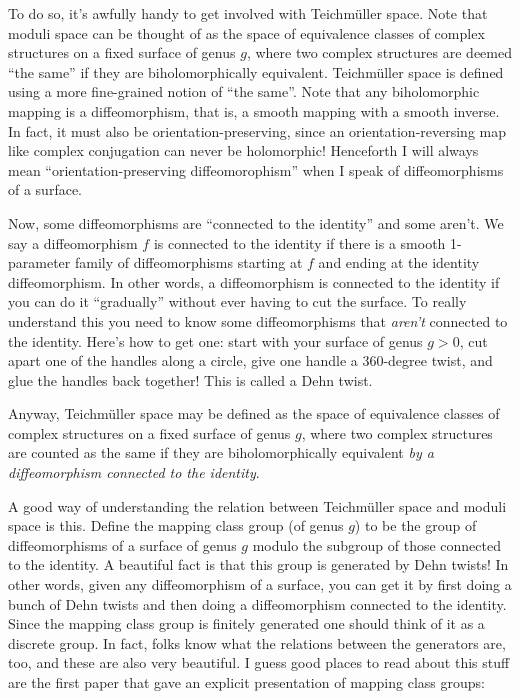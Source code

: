 \documentclass[12pt]{article}
\begin{document}
To do so, it's awfully handy to get involved with Teichm\"uller space.
Note that moduli space can be thought of as the space of equivalence
classes of complex structures on a fixed surface of genus \(g\), where
two complex structures are deemed ``the same'' if they are
biholomorphically equivalent. Teichm\"uller space is defined using a more
fine-grained notion of ``the same''. Note that any biholomorphic mapping
is a diffeomorphism, that is, a smooth mapping with a smooth inverse. In
fact, it must also be orientation-preserving, since an
orientation-reversing map like complex conjugation can never be
holomorphic! Henceforth I will always mean ``orientation-preserving
diffeomorophism'' when I speak of diffeomorphisms of a surface.

Now, some diffeomorphisms are ``connected to the identity'' and some
aren't. We say a diffeomorphism \(f\) is connected to the identity if
there is a smooth 1-parameter family of diffeomorphisms starting at
\(f\) and ending at the identity diffeomorphism. In other words, a
diffeomorphism is connected to the identity if you can do it
``gradually'' without ever having to cut the surface. To really
understand this you need to know some diffeomorphisms that \emph{aren't}
connected to the identity. Here's how to get one: start with your
surface of genus \(g > 0\), cut apart one of the handles along a circle,
give one handle a 360-degree twist, and glue the handles back together!
This is called a Dehn twist.

Anyway, Teichm\"uller space may be defined as the space of equivalence
classes of complex structures on a fixed surface of genus \(g\), where
two complex structures are counted as the same if they are
biholomorphically equivalent \emph{by a diffeomorphism connected to the
identity}.

A good way of understanding the relation between Teichm\"uller space and
moduli space is this. Define the mapping class group (of genus \(g\)) to
be the group of diffeomorphisms of a surface of genus \(g\) modulo the
subgroup of those connected to the identity. A beautiful fact is that
this group is generated by Dehn twists! In other words, given any
diffeomorphism of a surface, you can get it by first doing a bunch of
Dehn twists and then doing a diffeomorphism connected to the identity.
Since the mapping class group is finitely generated one should think of
it as a discrete group. In fact, folks know what the relations between
the generators are, too, and these are also very beautiful. I guess good
places to read about this stuff are the first paper that gave an
explicit presentation of mapping class groups:
\end{document}
